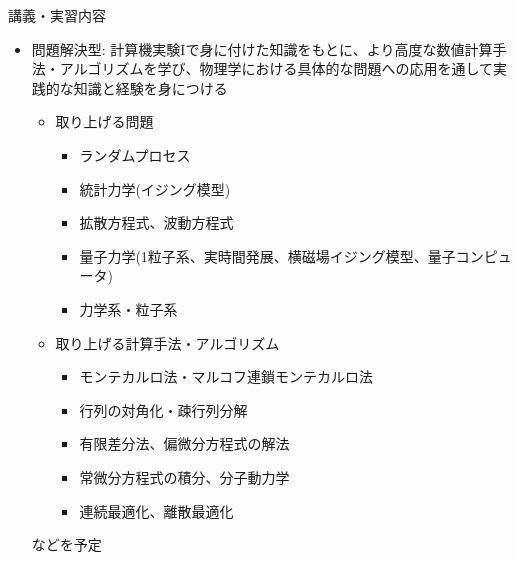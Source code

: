 \begin{frame}[t]{講義・実習内容}
  \begin{itemize}
    \setlength{\itemsep}{1em}
  \item 問題解決型: 計算機実験Iで身に付けた知識をもとに、より高度な数値計算手法・アルゴリズムを学び、物理学における具体的な問題への応用を通して実践的な知識と経験を身につける
    \begin{itemize}
    \item 取り上げる問題
      \begin{itemize}
      \item ランダムプロセス
      \item 統計力学(イジング模型)
      \item 拡散方程式、波動方程式
      \item 量子力学(1粒子系、実時間発展、横磁場イジング模型、量子コンピュータ)
      \item 力学系・粒子系
        
      \end{itemize}
    \item 取り上げる計算手法・アルゴリズム
      \begin{itemize}
      \item モンテカルロ法・マルコフ連鎖モンテカルロ法
      \item 行列の対角化・疎行列分解
      \item 有限差分法、偏微分方程式の解法
      \item 常微分方程式の積分、分子動力学
      \item 連続最適化、離散最適化
      \end{itemize}
    \end{itemize}
    などを予定
  \end{itemize}
\end{frame}

